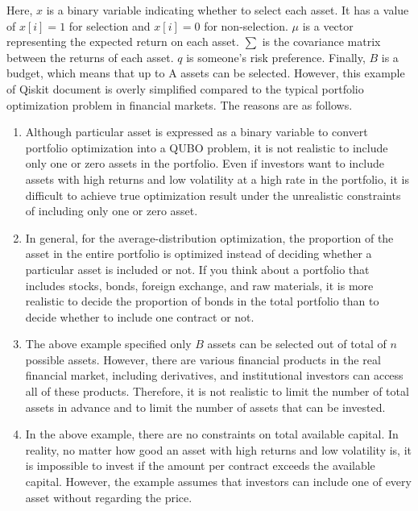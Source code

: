 \documentclass[a4paper]{article}
\theoremstyle{plain}
\theoremstyle{definition}
\begin{document}
Here, $x$ is a binary variable indicating whether to select each asset. It has a value of $x[i]=1$ for selection and $x[i]=0$ for non-selection. $\mu$  is a vector representing the expected return on each asset. $\displaystyle\sum$  is the covariance matrix between the returns of each asset. $q$ is someone's risk preference. Finally, $B$  is a budget, which means that up to A assets can be selected. However, this example of Qiskit document is overly simplified compared to the typical portfolio optimization problem in financial markets. The reasons are as follows.
\begin{enumerate}
\item Although particular asset is expressed as a binary variable to convert portfolio optimization into a QUBO problem, it is not realistic to include only one or zero assets in the portfolio. Even if investors want to include assets with high returns and low volatility  at a high rate in the portfolio, it is difficult to achieve true optimization result under the unrealistic constraints of including only one or zero asset. 

\item In general, for the average-distribution optimization, the proportion of the asset in the entire portfolio is optimized instead of deciding whether a particular asset is included or not. If you think about a portfolio that includes stocks, bonds, foreign exchange, and raw materials, it is more realistic to decide the proportion of bonds in the total portfolio than to decide whether to include one contract or not.

\item The above example specified only $B$ assets can be selected out of total of $n$  possible assets. However, there are various financial products in the real financial market, including derivatives, and institutional investors can access all of these products. Therefore, it is not realistic to limit the number of total assets in advance and to limit the number of assets that can be invested. 

\item In the above example, there are no constraints on total available capital. In reality, no matter how good an asset with high returns and low volatility is, it is impossible to invest if the amount per contract exceeds the available capital. However, the example assumes that investors can include one of every asset without regarding the price. 

\end{enumerate}

\end{document}
